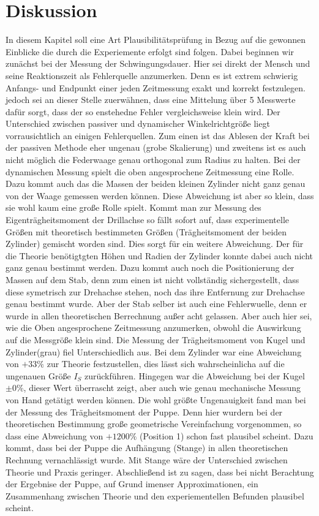 \section{Diskussion}
In diesem Kapitel soll eine Art Plausibilitätsprüfung in Bezug auf die
gewonnen Einblicke die durch die Experiemente erfolgt sind folgen.
Dabei beginnen wir zunächst bei der Messung der Schwingungsdauer.
Hier sei direkt der Mensch und seine Reaktionszeit als Fehlerquelle anzumerken. Denn es ist extrem schwierig Anfangs- und Endpunkt einer jeden Zeitmessung exakt und korrekt festzulegen. jedoch sei an dieser Stelle  zuerwähnen, dass eine Mittelung über 5 Messwerte dafür sorgt, dass der so enstehedne Fehler vergleichsweise klein wird.
Der Unterschied zwischen passiver und dynamischer Winkelrichtgröße liegt vorrausichtlich an einigen Fehlerquellen. Zum einen ist das Ablesen der Kraft bei der passiven Methode eher ungenau (grobe Skalierung) und zweitens ist es auch nicht möglich 
die Federwaage genau orthogonal zum Radius zu halten.
Bei der dynamischen Messung spielt die oben angesprochene Zeitmessung eine Rolle.
Dazu kommt auch das die Massen der beiden kleinen Zylinder nicht ganz genau von der Waage gemessen werden können.
 Diese Abweichung ist aber so klein, dass sie wohl kaum eine große Rolle spielt.
Kommt man zur Messung des Eigenträgheitsmoment der Drillachse so fällt sofort auf, dass experimentelle Größen mit theoretisch bestimmeten Größen (Trägheitsmoment der beiden Zylinder) gemischt worden sind. Dies sorgt für ein weitere Abweichung. Der für die Theorie benötigtgten Höhen und Radien der Zylinder konnte dabei auch nicht ganz genau bestimmt werden.
Dazu kommt auch noch die Positionierung der Massen auf dem Stab, denn zum einen ist nicht vollständig sichergestellt, dass diese symetrisch zur Drehachse stehen, noch das ihre Entfernung zur Drehachse genau bestimmt wurde. Aber der Stab selber ist auch eine Fehlerwuelle, denn er wurde in allen theoretischen Berrechnung außer acht gelassen.
Aber auch hier sei, wie die Oben angesprochene Zeitmessung anzumerken, obwohl die Auswirkung auf die Messgröße klein sind.
Die Messung der Trägheitsmoment von Kugel und Zylinder(grau) fiel Unterschiedlich aus.
Bei dem  Zylinder war eine Abweichung von $+33\%$ zur Theorie festzustellen, 
dies lässt sich wahrscheinlicha auf die ungenauen Größe $I_S$ zurückführen.
Hingegen war die Abweichung bei der Kugel $\pm 0\%$, dieser Wert überrascht zeigt, aber auch wie genau mechanische Messung von Hand getätigt werden können.
Die wohl größte Ungenauigkeit fand man bei der Messung des Trägheitsmoment der Puppe. Denn hier wurdern bei der theoretischen Bestimmung große geometrische Vereinfachung vorgenommen, so dass eine Abweichung von $+1200\%$ (Position 1) schon fast plausibel scheint. %
Dazu kommt, dass bei der Puppe die Aufhängung (Stange) in allen theoretischen Rechnung vernachlässigt wurde. Mit Stange wäre der Unterschied zwischen Theorie und Praxis geringer.
Abschließend ist zu sagen, dass bei nicht Berachtung der Ergebnise der Puppe, auf Grund imenser Approximationen, ein Zusammenhang zwischen Theorie und den experiementellen Befunden plausibel scheint.